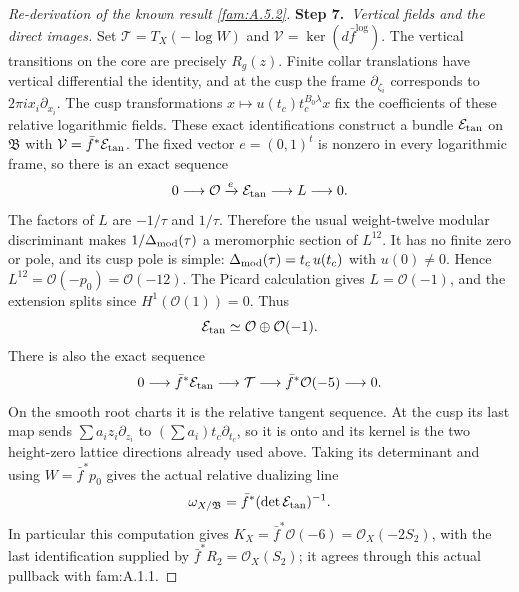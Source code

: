 \begin{proof}[Re-derivation of the known result \ref{fam:A.5.2}]
\par\smallskip\noindent\textbf{Step 7.}\ \emph{Vertical fields and the direct images.}
Set $\mathcal T=T_X(-\log W)$ and
$\mathcal V=\ker(d\bar f^{\log})$.
The vertical transitions on the core are precisely $R_g(z)$.
Finite collar translations have vertical differential the identity,
and at the cusp the frame $\partial_{\zeta_i}$ corresponds to
$2\pi i x_i\partial_{x_i}$. The cusp transformations
$x\mapsto u(t_c)t_c^{B_0\lambda}x$ fix the coefficients of these
relative logarithmic fields. These exact identifications construct
a bundle $\mathcal E_{\rm tan}$ on $\mathfrak B$ with
$\mathcal V=\bar f^*\mathcal E_{\rm tan}$.
The fixed vector $e=(0,1)^t$ is nonzero in every logarithmic frame,
so there is an exact sequence
\[
 0\longrightarrow\mathcal O\xrightarrow{e}\mathcal E_{\rm tan}
 \longrightarrow L\longrightarrow0.
\]
The factors of $L$ are $-1/\tau$ and $1/\tau$. Therefore the usual
weight-twelve modular discriminant makes $1/\Delta_{\rm mod}(\tau)$ a
meromorphic section of $L^{12}$. It has no finite zero or pole,
and its cusp pole is simple: $\Delta_{\rm mod}(\tau)=t_c\,u(t_c)$ with
$u(0)\ne0$. Hence $L^{12}=\mathcal O(-p_0)=\mathcal O(-12)$.
The Picard calculation gives $L=\mathcal O(-1)$, and the extension
splits since $H^1(\mathcal O(1))=0$. Thus
\[
 \mathcal E_{\rm tan}\simeq\mathcal O\oplus\mathcal O(-1).
\]
There is also the exact sequence
\begin{equation}\label{fam:eq:ab-log-tangent}
 0\longrightarrow\bar f^*\mathcal E_{\rm tan}\longrightarrow\mathcal T
 \longrightarrow\bar f^*\mathcal O(-5)\longrightarrow0.
\end{equation}
On the smooth root charts it is the relative tangent sequence. At the
cusp its last map sends $\sum a_i z_i\partial_{z_i}$ to
$(\sum a_i)t_c\partial_{t_c}$, so it is onto and its kernel is the
two height-zero lattice directions already used above. Taking its
determinant and using $W=\bar f^*p_0$ gives the actual relative
dualizing line
\begin{equation}\label{fam:eq:ab-relative-dualizing}
 \omega_{X/\mathfrak B}=\bar f^*(\det\mathcal E_{\rm tan})^{-1}.
\end{equation}
In particular this computation gives
$K_X=\bar f^*\mathcal O(-6)=\mathcal O_X(-2S_2)$, with the last
identification supplied by $\bar f^*R_2=\mathcal O_X(S_2)$;
it agrees through this actual pullback with fam:A.1.1.


\end{proof}
